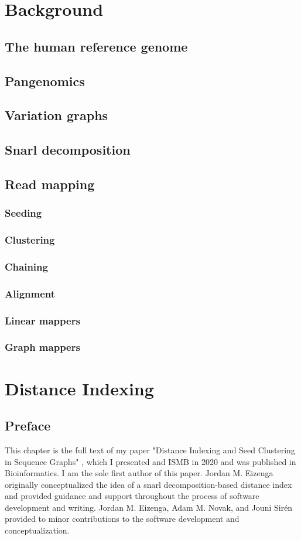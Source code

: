 \documentclass[11pt]{ucscthesis}
\begin{document}
\chapter{Background}
\section{The human reference genome}
\section{Pangenomics}
\section{Variation graphs}
\section{Snarl decomposition}
\section{Read mapping}
\subsection{Seeding}
\subsection{Clustering}
\subsection{Chaining}
\subsection{Alignment}
\subsection{Linear mappers}
\subsection{Graph mappers}

\chapter{Distance Indexing}

\section{Preface}
This chapter is the full text of my paper "Distance Indexing and Seed Clustering in Sequence Graphs" \cite{chang_distance_2020}, which I presented and ISMB in 2020 and was published in Bioinformatics.
I am the sole first author of this paper. 
Jordan M. Eizenga originally conceptualized the idea of a snarl decomposition-based distance index and provided guidance and support throughout the process of software development and writing.
Jordan M. Eizenga, Adam M. Novak, and Jouni Sirén provided to minor contributions to the software development and conceptualization. 
\end{document}
